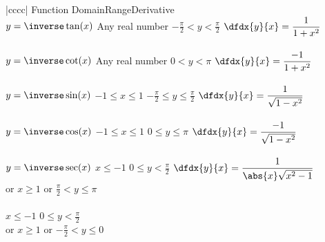 \begin{center}
  \begin{tabular}{|cccc|} \hline Function\amp{}
                                           Domain\amp{}Range\amp{}Derivative\\\hline\hline $y=\inverse\tan(x)$ \amp{} Any
                                                                                                       real number \amp{} $-\frac{\pi}{2}\lt{}y\lt{}\frac{\pi}{2}$
                                                       \amp{}$\displaystyle\dfdx{y}{x}=\frac{1}{1+x^2}$\\
                                         \amp{}\amp{}\amp{}\\
    $y=\inverse\cot(x)$ \amp{} Any real number \amp{} $0\lt{}y\lt{}\pi$
                                                       \amp{}$\displaystyle\dfdx{y}{x}=\frac{-1}{1+x^2}$\\
                                         \amp{}\amp{}\amp{}\\
    $y=\inverse\sin(x)$ \amp{} $-1\le x\le 1$ \amp{}
                                           $-\frac{\pi}{2}\le
                                           y\le\frac{\pi}{2}$
                                                       \amp{}$\displaystyle\dfdx{y}{x}=\frac{1}{\sqrt{1-x^2}}$\\
                                         \amp{}\amp{}\amp{}\\
    $y=\inverse\cos(x)$ \amp{} $-1\le x\le 1$ \amp{} $0\le y\le\pi$
                                                       \amp{}$\displaystyle\dfdx{y}{x}=\frac{-1}{\sqrt{1-x^2}}$\\
                                         \amp{}\amp{}\amp{}\\
     {$y=\inverse\sec(x)$} \amp{}$x\le-1$
                                                 \amp{}$0\le y\lt{}\frac{\pi}{2}$ \amp{}
                                                                           {$\displaystyle\dfdx{y}{x}=\frac{1}{\abs{x}\sqrt{x^2-1}}$}\\
                                         \amp{} or $ x\ge 1$
                                                 \amp{}or $\frac{\pi}{2}\lt{}y\le\pi$\amp{}\\
                                         \amp{}\amp{}\amp{}\\
     \amp{}$x\le-1$
                                                 \amp{}$0\le y\lt{}\frac{\pi}{2}$
                                                       \amp{}\\
                                         \amp{} or $ x\ge 1$
                                                 \amp{}or $-\frac{\pi}{2}\lt{}y\le0$\amp{}\\
                                         \amp{}\amp{}\amp{}\\\hline
  \end{tabular}
\end{center}
